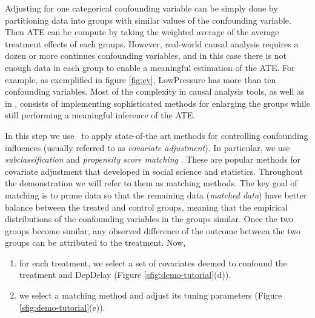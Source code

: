  Adjusting for one categorical confounding variable can be simply done by partitioning data into
 groups with similar values of the confounding variable. Then ATE can be compute by taking the weighted average of the average treatment effects of each groups. However, real-world causal analysis requires a dozen or more continues confounding variables, and in this case there is not enough data in each group to enable a meaningful estimation of the ATE. For example, as exemplified in figure \ref{fig:cv}, LowPressure has more than ten confounding variables.  Most of the complexity in causal analysis tools, as well as in \GSQL, consists of implementing sophisticated methods for enlarging the groups while still performing a meaningful inference of the ATE.
In this step we use \GSQL\ to apply state-of-the art methods for controlling confounding influences (usually referred to as {\em covariate adjustment}).
In particular, we use {\em subclassification} and {\it propensity score matching} \cite{Rubin1983b,IacKinPor09,rosenbaum1984reducing}.
These are popular methods for  covariate adjustment that developed in social science and statistics. Throughout the demonstration we will refer to them as matching methods.
The key goal of matching is to prune data so that
the remaining data ({\em matched data}) have better balance between the treated and control groups, meaning that the empirical distributions of the confounding variables in the groups  similar.
Once the two groups become similar, any observed difference of the outcome between the two groups can be attributed to the treatment. Now,
     \begin{enumerate}
      \item for each treatment, we select a set of covariates deemed to confound the treatment and DepDelay (Figure \ref{sfig:demo-tutorial}(d)).
      \item we select a matching method and adjust its tuning parameters (Figure \ref{sfig:demo-tutorial}(e)).
\end{enumerate}

